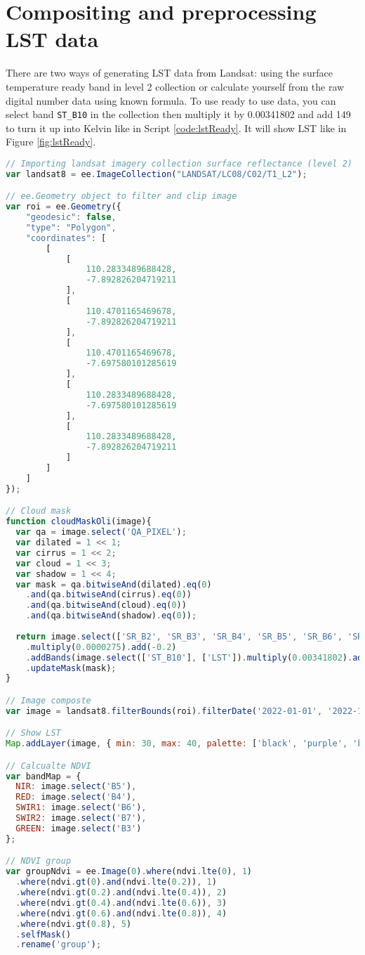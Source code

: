 \section{Compositing and preprocessing LST data}
There are two ways of generating LST data from Landsat: using the surface temperature ready band in level 2 collection or calculate yourself from the raw digital number data using known formula. To use ready to use data, you can select band \verb|ST_B10| in the collection then multiply it by 0.00341802 and add 149 to turn it up into Kelvin like in Script \ref{code:lstReady}. It will show LST like in Figure \ref{fig:lstReady}.

\begin{lstlisting}[language=JavaScript, label={code:lstReady}, caption={GEE Script get LST data}]
// Importing landsat imagery collection surface reflectance (level 2)
var landsat8 = ee.ImageCollection("LANDSAT/LC08/C02/T1_L2");

// ee.Geometry object to filter and clip image
var roi = ee.Geometry({
	"geodesic": false,
	"type": "Polygon",
	"coordinates": [
		[
			[
				110.2833489688428,
				-7.892826204719211
			],
			[
				110.4701165469678,
				-7.892826204719211
			],
			[
				110.4701165469678,
				-7.697580101285619
			],
			[
				110.2833489688428,
				-7.697580101285619
			],
			[
				110.2833489688428,
				-7.892826204719211
			]
		]
	]
});

// Cloud mask
function cloudMaskOli(image){
  var qa = image.select('QA_PIXEL');
  var dilated = 1 << 1;
  var cirrus = 1 << 2;
  var cloud = 1 << 3;
  var shadow = 1 << 4;
  var mask = qa.bitwiseAnd(dilated).eq(0)
    .and(qa.bitwiseAnd(cirrus).eq(0))
    .and(qa.bitwiseAnd(cloud).eq(0))
    .and(qa.bitwiseAnd(shadow).eq(0));
  
  return image.select(['SR_B2', 'SR_B3', 'SR_B4', 'SR_B5', 'SR_B6', 'SR_B7'], ['B2', 'B3', 'B4', 'B5', 'B6', 'B7'])
    .multiply(0.0000275).add(-0.2)
    .addBands(image.select(['ST_B10'], ['LST']).multiply(0.00341802).add(149).add(-273.15))
    .updateMask(mask);
}

// Image composte
var image = landsat8.filterBounds(roi).filterDate('2022-01-01', '2022-12-31').map(cloudMaskOli).median().clip(roi);

// Show LST
Map.addLayer(image, { min: 30, max: 40, palette: ['black', 'purple', 'blue', 'cyan', 'green', 'yellow', 'red'], bands: 'LST' }, 'LST');

// Calcualte NDVI
var bandMap = {
  NIR: image.select('B5'),
  RED: image.select('B4'),
  SWIR1: image.select('B6'),
  SWIR2: image.select('B7'),
  GREEN: image.select('B3')
};

// NDVI group
var groupNdvi = ee.Image(0).where(ndvi.lte(0), 1)
  .where(ndvi.gt(0).and(ndvi.lte(0.2)), 1)
  .where(ndvi.gt(0.2).and(ndvi.lte(0.4)), 2)
  .where(ndvi.gt(0.4).and(ndvi.lte(0.6)), 3)
  .where(ndvi.gt(0.6).and(ndvi.lte(0.8)), 4)
  .where(ndvi.gt(0.8), 5)
  .selfMask()
  .rename('group');
\end{lstlisting}

